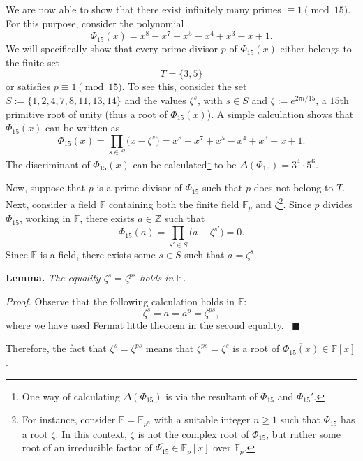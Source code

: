 \documentclass[a4paper, 12pt]{article}
\theoremstyle{definition}
\newcommand{\Z}{\mathbb{Z}}
\newcommand{\F}{\mathbb{F}}
\begin{document}
We are now able to show that there exist infinitely many primes $\equiv 1\pmod{15}$. For this purpose, consider the polynomial 
\begin{equation*}
\Phi_{15}(x)=x^{8} - x^{7} + x^{5} - x^{4} + x^{3} - x + 1.
\end{equation*}
We will specifically show that every prime divisor $p$ of $\Phi_{15}(x)$ either belongs to the finite set 
\begin{equation*}
T=\{3, 5\}
\end{equation*}
or satisfies $p\equiv 1 \pmod{15}$. To see this, consider the set $S:=\{1, 2, 4, 7, 8, 11, 13, 14\}$ and the values $\zeta^{s}$, with $s\in S$ and $\zeta:=e^{2\pi i/{15}}$, a $15$th primitive root of unity (thus a root of $\Phi_{15}(x)$). A simple calculation shows that $\Phi_{15}(x)$ can be written as
\begin{equation*}
\Phi_{15}(x)=\prod_{s\in S}\big(x-\zeta^{s}\big)=x^{8} - x^{7} + x^{5} - x^{4} + x^{3} - x + 1.
\end{equation*}
The discriminant of $\Phi_{15}(x)$ can be calculated\footnote{One way of calculating $\Delta(\Phi_{15})$ is via the resultant of $\Phi_{15}$ and $\Phi_{15}'$.} to be $\Delta(\Phi_{15})=3^{4} \cdot 5^{6}$.

Now, suppose that $p$ is a prime divisor of $\Phi_{15}$ such that $p$ does not belong to $T$. Next, consider a field $\F$ containing both the finite field $\F_p$ and $\zeta$\footnote{For instance, consider $\F=\F_{p^n}$ with a suitable integer $n\geqslant 1$ such that $\Phi_{15}$ has a root $\zeta$. In this context, $\zeta$ is not the complex root of $\Phi_{15}$, but rather some root of an irreducible factor of $\overline{\Phi_{15}}\in\F_p[x]$ over $\F_p$.}. Since $p$ divides $\Phi_{15}$, working in $\F$, there exists $a\in\Z$ such that 
\begin{equation*}
\Phi_{15}(a)=\prod_{s'\in S}\big(a-\zeta^{s'}\big)=0.
\end{equation*}
Since $\F$ is a field, there exists some $s\in S$ such that $a=\zeta^{s}$.

\textbf{Lemma.} \emph{The equality $\zeta^s=\zeta^{ps}$ holds in $\F$.}

\textit{Proof.} Observe that the following calculation holds in $\F$:
\begin{equation*}\label{eq:reproots}
\zeta^{s}=a=a^p=\zeta^{ps},
\end{equation*}
where we have used Fermat little theorem in the second equality. \ $\blacksquare$ 

Therefore, the fact that $\zeta^{s}=\zeta^{ps}$ means that $\zeta^{ps}=\zeta^{s}$ is a root of $\overline{\Phi_{15}(x)}\in\F[x]$. 
\end{document}
